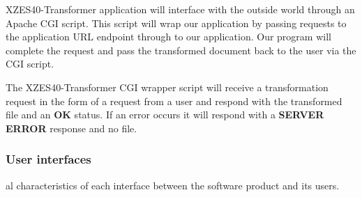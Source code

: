 XZES40-Transformer application will interface with the outside world through an Apache CGI script.
This script will wrap our application by passing  requests to the application URL endpoint through to our application.
Our program will complete the request and pass the transformed document back to the user via the CGI script.

The XZES40-Transformer CGI wrapper script will receive a transformation request in the form of a  request from a user and respond with the transformed file and an \textbf{OK} status.
If an error occurs it will respond with a \textbf{SERVER ERROR} response and no file.

%

\subsubsection{User interfaces}
al characteristics of each interface between the software product and its users.


